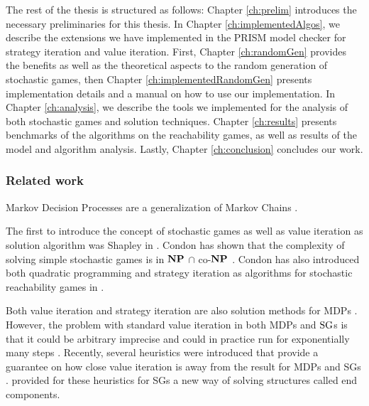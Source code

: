 
The rest of the thesis is structured as follows:
Chapter \ref{ch:prelim} introduces the necessary preliminaries for this thesis.
In Chapter \ref{ch:implementedAlgos}, we describe the extensions we have implemented in the PRISM model checker for strategy iteration and value iteration.
First, Chapter \ref{ch:randomGen} provides the benefits as well as the theoretical aspects to the random generation of stochastic games,
then Chapter \ref{ch:implementedRandomGen} presents implementation details and a manual on how to use our implementation.
In Chapter \ref{ch:analysis}, we describe the tools we implemented for the analysis of both stochastic games and solution techniques.
Chapter \ref{ch:results} presents benchmarks of the algorithms on the reachability games, as well as results of the model and algorithm analysis.
Lastly, Chapter \ref{ch:conclusion} concludes our work.

\subsubsection*{Related work}
Markov Decision Processes are a generalization of Markov Chains \cite{Puterman} \cite[Ch.~11]{introProb}.

The first to introduce the concept of stochastic games as well as value iteration as solution algorithm was Shapley in \cite{shapley}.
Condon has shown that the complexity of solving simple stochastic games is in $\mathbf{NP}$ $\cap$ co-$\mathbf{NP}$ \cite{condonComplexity}.
Condon has also introduced both quadratic programming and strategy iteration as algorithms for stochastic reachability games in \cite{condonQP}. 

Both value iteration and strategy iteration are also solution methods for MDPs \cite{Puterman}\cite{HoffmanKarp}.
However, the problem with standard value iteration in both MDPs and $\textrm{SG}$s is that it could be arbitrary imprecise \cite{haddadmonmege} and 
could in practice run for exponentially many steps \cite{viExponential}.
Recently, several heuristics were introduced that provide a guarantee on how close value iteration is away from the result for MDPs \cite{haddadmonmege} and SGs \cite{paperMaxi}.
\cite{widestPath} provided for these heuristics for SGs a new way of solving structures called end components.

